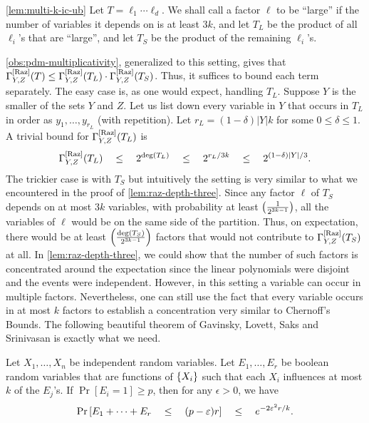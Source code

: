\begin{proofof}{\autoref{lem:multi-k-ic-ub}}
Let $T = \ell_1 \cdots \ell_d$.
We shall call a factor $\ell$ to be ``large'' if the number of variables it depends on is at least $3k$, and let $T_L$ be the product of all $\ell_i$'s that are ``large'', and let $T_S$ be the product of the remaining $\ell_i$'s.


\autoref{obs:pdm-multiplicativity}, generalized to this setting, gives that $\Gamma^{\mathrm{[Raz]}}_{Y,Z}(T) \leq \Gamma^{\mathrm{[Raz]}}_{Y,Z}(T_L) \cdot \Gamma^{\mathrm{[Raz]}}_{Y,Z}(T_S)$.
Thus, it suffices to bound each term separately.
The easy case is, as one would expect, handling $T_L$.
Suppose $Y$ is the smaller of the sets $Y$ and $Z$.
Let us list down every variable in $Y$ that occurs in $T_L$ in order as $y_1,\dots, y_{r_L}$ (with repetition).
Let $r_L = (1-\delta) |Y|k$ for some $0\leq \delta \leq 1$.
A trivial bound for $\Gamma^{\mathrm{[Raz]}}_{Y,Z}(T_L)$ is
\begin{equation}\label{eqn:TL-bound}
\Gamma^{\mathrm{[Raz]}}_{Y,Z}(T_L)\quad \leq \quad 2^{\deg(T_L)} \quad \leq \quad 2^{r_L/3k} \quad \leq \quad 2^{(1-\delta)|Y|/3}.
\end{equation}
The trickier case is with $T_S$ but intuitively the setting is very similar to what we encountered in the proof of \autoref{lem:raz-depth-three}.
Since any factor $\ell$ of $T_S$ depends on at most $3k$ variables, with probability at least $\left(\frac{1}{2^{3k-1}}\right)$, all the variables of $\ell$ would be on the same side of the partition.
Thus, on expectation, there would be at least $\left(\frac{\deg(T_S)}{2^{3k-1}}\right)$ factors that would not contribute to $\Gamma^{\mathrm{[Raz]}}_{Y,Z}(T_S)$ at all.
In \autoref{lem:raz-depth-three}, we could show that the number of such factors is concentrated around the expectation since the linear polynomials were disjoint and the events were independent.
However, in this setting a variable can occur in multiple factors.
Nevertheless, one can still use the fact that every variable occurs in at most $k$ factors to establish a concentration very similar to Chernoff's Bounds.
The following beautiful theorem of Gavinsky, Lovett, Saks and Srinivasan \cite{GLSS12} is exactly what we need.

\begin{theorem}
Let $X_1,\dots, X_n$ be independent random variables.
Let $E_1,\dots, E_r$ be boolean random variables that are functions of $\left\{X_i\right\}$ such that each $X_i$ influences at most $k$ of the $E_j$'s.
If $\Pr[E_i = 1] \geq p$, then for any $\epsilon > 0$, we have
\[
\Pr\left[E_1 + \dots + E_r  \quad \leq \quad (p - \varepsilon) r \right] \quad \leq \quad e^{-2\varepsilon^2 r/k}.
\]
\end{theorem}


\end{proofof}
